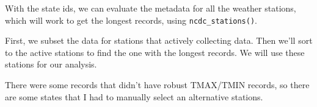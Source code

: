\documentclass{article}
\begin{document}
With the state ids, we can evaluate the metadata for all the weather stations, which will work to get the longest records, using \texttt{ncdc\_stations()}. 

First, we subset the data for stations that actively collecting data. Then we'll sort to the active stations to find the one with the longest records. We will use these stations for our analysis. 

There were some records that didn't have robust TMAX/TMIN records, so there are some states that I had to manually select an alternative stations. 

\begin{knitrout}
\color{fgcolor}\begin{kframe}
\begin{alltt}
 \hlkwb{<-} \hlstd{(}\hlstd{=}\hlstd{,}
                \hlstd{=} \hlstd{(}\hlstd{,} \hlstd{),}
               \hlopt{$} \hlstd{=}\hlstd{,}
                \hlstd{=} \hlstd{,} \hlstd{=}\hlstd{)}

 \hlkwb{=}
   \hlopt{$}\hlstd{data[GSOM_Stations}\hlopt{$}\hlopt{$}\hlopt{>=}\hlstd{,]}

 \hlkwb{=}  \hlstd{=}\hlopt{<}  \hlopt{&}  \hlopt{>}  \hlopt{&}  \hlopt{< -} \hlopt{&}  \hlopt{> -}\hlstd{))}


\end{alltt}
\end{kframe}
\end{knitrout}
\end{document}
